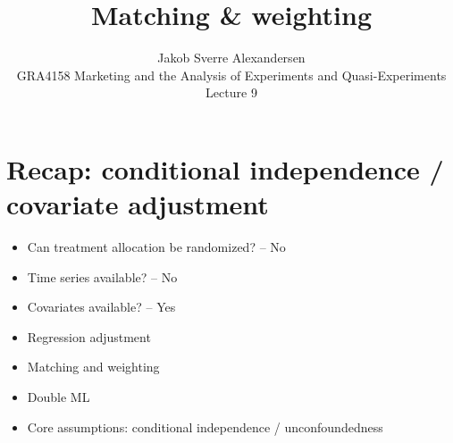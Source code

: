 \documentclass[10pt]{article}
\begin{document}
 
\title{Matching \& weighting}
\author{Jakob Sverre Alexandersen\\
GRA4158 Marketing and the Analysis of Experiments and Quasi-Experiments\\
Lecture 9}
\maketitle

\tableofcontents
\newpage
\section{Recap: conditional independence / covariate adjustment}
\begin{itemize}
    \item Can treatment allocation be randomized? -- No
    \item Time series available? -- No 
    \item Covariates available? -- Yes
    \item Regression adjustment 
    \item Matching and weighting
    \item Double ML 
    \item Core assumptions: conditional independence / unconfoundedness
\end{itemize}
\end{document}
